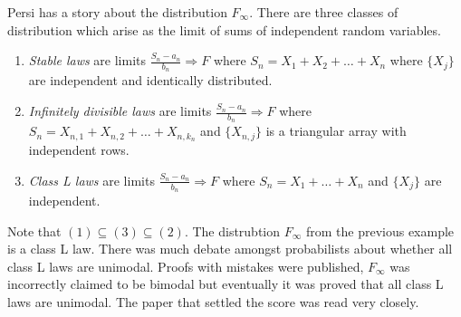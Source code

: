 \begin{remark}
    Persi has a story about the distribution $F_\infty$. There are three classes of distribution which arise as the limit of sums of independent random variables. 
    \begin{enumerate}
        \item \emph{Stable laws} are limits $\frac{S_n-a_n}{b_n} \Rightarrow F$ where $S_n = X_1+X_2+\ldots+X_n$ where $\{X_j\}$ are independent and identically distributed.
        \item \emph{Infinitely divisible laws} are limits $\frac{S_n-a_n}{b_n} \Rightarrow F$ where $S_n = X_{n,1}+X_{n,2}+\ldots+X_{n,k_n}$ and $\{X_{n,j}\}$ is a triangular array with independent rows. 
        \item \emph{Class L laws} are limits $\frac{S_n - a_n}{b_n} \Rightarrow F$ where $S_n = X_1+\ldots+X_n$ and $\{X_j\}$ are independent.
    \end{enumerate}
    Note that $(1) \subseteq (3) \subseteq (2)$. The distrubtion $F_\infty$ from the previous example is a class L law. There was much debate amongst probabilists about whether all class L laws are unimodal. Proofs with mistakes were published, $F_\infty$ was incorrectly claimed to be bimodal but eventually it was proved that all class L laws are unimodal. The paper that settled the score was read very closely.
\end{remark}
